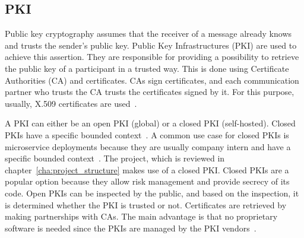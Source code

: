 \subsection{PKI}
Public key cryptography assumes that the receiver of a message already knows and trusts the sender's public key.
Public Key Infrastructures (PKI) are used to achieve this assertion.
They are responsible for providing a possibility to retrieve the public key of a participant in a trusted way.
This is done using Certificate Authorities (CA) and certificates.
CAs sign certificates, and each communication partner who trusts the CA trusts the certificates signed by it.
For this purpose, usually, X.509 certificates are used~\cite{anderson2020security}.

A PKI can either be an open PKI (global) or a closed PKI (self-hosted).
Closed PKIs have a specific bounded context~\cite{hlavaty2003risk}.
A common use case for closed PKIs is microservice deployments because they are usually company intern and have a specific bounded context~\cite{dias2020microservices}.
The project, which is reviewed in chapter~\ref{cha:project_structure} makes use of a closed PKI.
Closed PKIs are a popular option because they allow risk management and provide secrecy of its code.
Open PKIs can be inspected by the public, and based on the inspection, it is determined whether the PKI is trusted or not.
Certificates are retrieved by making partnerships with CAs.
The main advantage is that no proprietary software is needed since the PKIs are managed by the PKI vendors~\cite{hlavaty2003risk}.

